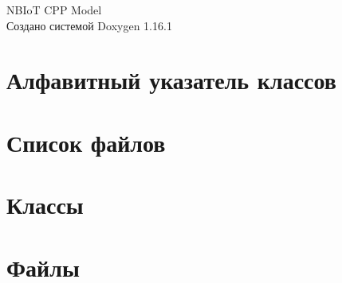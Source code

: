 \documentclass[twoside]{book}
\newcommand{\+}{\discretionary{\mbox{\scriptsize$\hookleftarrow$}}{}{}}
\newcommand{\clearemptydoublepage}{%
    \newpage{\pagestyle{empty}\cleardoublepage}%
  }
\begin{document}
  \raggedbottom
    \hypersetup{pageanchor=false,
                bookmarksnumbered=true,
                pdfencoding=unicode
               }
  \begin{titlepage}
  \vspace*{7cm}
  \begin{center}%
  {\Large NBIo\+T CPP Model}\\
  \vspace*{1cm}
  {\large Создано системой Doxygen 1.16.1}\\
  \end{center}
  \end{titlepage}
  \clearemptydoublepage
  \tableofcontents
  \clearemptydoublepage
  \hypersetup{pageanchor=true}
\chapter{Алфавитный указатель классов}

\chapter{Список файлов}

\chapter{Классы}




\chapter{Файлы}











  \backmatter
  \newpage
  \clearemptydoublepage
  \printindex
\end{document}

